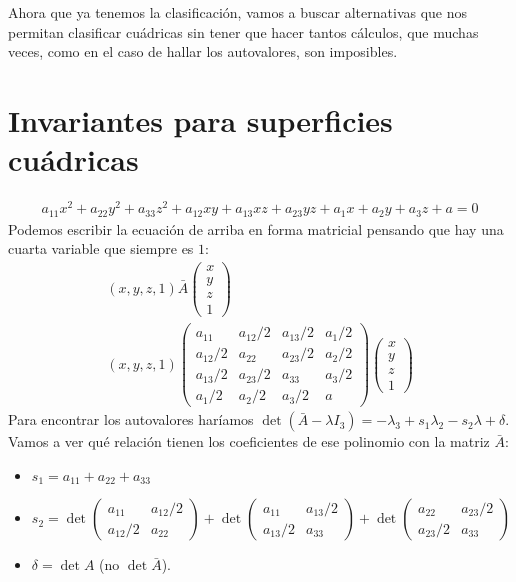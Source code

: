 \documentclass[14pt]{book}
\begin{document}
Ahora que ya tenemos la clasificación, vamos a buscar alternativas que nos permitan clasificar cuádricas sin tener que hacer tantos cálculos, que muchas veces, como en el caso de hallar los autovalores, son imposibles.

\section{Invariantes para superficies cuádricas}
\begin{align*}
	a_{11}x^2 + a_{22}y^2 + a_{33}z^2 + a_{12}xy + a_{13}xz + a_{23}yz + a_1x + a_2y + a_3z + a = 0
\end{align*}
Podemos escribir la ecuación de arriba en forma matricial pensando que hay una cuarta variable que siempre es $1$:
\begin{align}
(x, y, z, 1)\bar{A}\left(\begin{array}{c}
x \\ y \\ z \\ 1
\end{array}\right) \\
(x, y, z, 1)\left(\begin{array}{cccc}
a_{11} & a_{12}/2 & a_{13}/2 & a_1/2 \\
a_{12}/2 & a_{22} & a_{23}/2 & a_2/2\\
a_{13}/2 & a_{23}/2 & a_{33} & a_3/2 \\
a_1/2 & a_2/2 & a_3/2 & a
\end{array}\right)\left(\begin{array}{c}
x \\ y \\ z \\ 1
\end{array}\right)
\end{align}
Para encontrar los autovalores haríamos $\det(\bar{A} - \lambda I_3) = -\lambda_3 + s_1\lambda_2 - s_2\lambda + \delta$. Vamos a ver qué relación tienen los coeficientes de ese polinomio con la matriz $\bar{A}$:
\begin{itemize}
	\item $s_1 = a_{11} + a_{22} + a_{33}$
	\item $s_2 = \det\left(\begin{array}{cc}
	a_{11} & a_{12}/2 \\
	a_{12}/2 & a_{22}
	\end{array}\right) + \det\left(\begin{array}{cc}
	a_{11} & a_{13}/2 \\
	a_{13}/2 & a_{33}
	\end{array}\right) + \det\left(\begin{array}{cc}
	a_{22} & a_{23}/2 \\
	a_{23}/2 & a_{33}
	\end{array}\right)$
	\item $\delta = \det A$ (no $\det \bar{A}$).
\end{itemize}
\end{document}
